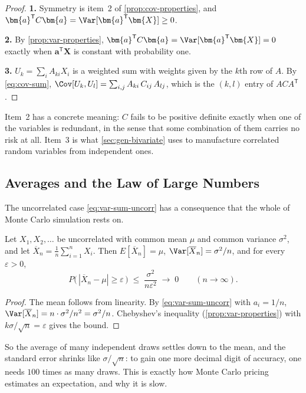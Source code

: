 \begin{proof}
	\textbf{1.} Symmetry is item~2 of \autoref{prop:cov-properties}, and $\bm{a}^{\mathsf{T}}C\bm{a}=\Var[\bm{a}^{\mathsf{T}}\bm{X}]\ge0$.

	\textbf{2.} By \autoref{prop:var-properties}, $\bm{a}^{\mathsf{T}}C\bm{a}=\Var[\bm{a}^{\mathsf{T}}\bm{X}]=0$ exactly when $\bm{a}^{\mathsf{T}}\bm{X}$ is constant with probability one.

	\textbf{3.} $U_{k}=\sum_{i}A_{ki}X_{i}$ is a weighted sum with weights given by the $k$th row of $A$.
	By \eqref{eq:cov-sum}, $\Cov[U_{k},U_{l}]=\sum_{i,j}A_{ki}\,C_{ij}\,A_{lj}$, which is the $(k,l)$ entry of $ACA^{\mathsf{T}}$.
\end{proof}

Item~2 has a concrete meaning: $C$ fails to be positive definite exactly when one of the variables is redundant, in the sense that some combination of them carries no risk at all.
Item~3 is what \autoref{sec:gen-bivariate} uses to manufacture correlated random variables from independent ones.

\subsection{Averages and the Law of Large Numbers}

The uncorrelated case \eqref{eq:var-sum-uncorr} has a consequence that the whole of Monte Carlo simulation rests on.

\begin{theorem}\label{thm:lln}
	Let $X_{1},X_{2},\dots$ be uncorrelated with common mean $\mu$ and common variance $\sigma^{2}$, and let $\overline{X}_{n}=\frac1n\sum_{i=1}^{n}X_{i}$.
	Then $E[\overline{X}_{n}]=\mu$, $\Var[\overline{X}_{n}]=\sigma^{2}/n$, and for every $\varepsilon>0$,
	\[
		P\bigl(\,|\overline{X}_{n}-\mu|\ge\varepsilon\,\bigr) \;\le\; \frac{\sigma^{2}}{n\varepsilon^{2}} \;\longrightarrow\; 0
		\qquad (n\to\infty) .
	\]
\end{theorem}

\begin{proof}
	The mean follows from linearity.
	By \eqref{eq:var-sum-uncorr} with $a_{i}=1/n$, $\Var[\overline{X}_{n}]=n\cdot\sigma^{2}/n^{2}=\sigma^{2}/n$.
	Chebyshev's inequality (\autoref{prop:var-properties}) with $k\sigma/\sqrt n=\varepsilon$ gives the bound.
\end{proof}

So the average of many independent draws settles down to the mean, and the standard error shrinks like $\sigma/\sqrt{n}$: to gain one more decimal digit of accuracy, one needs $100$ times as many draws.
This is exactly how Monte Carlo pricing estimates an expectation, and why it is slow.

